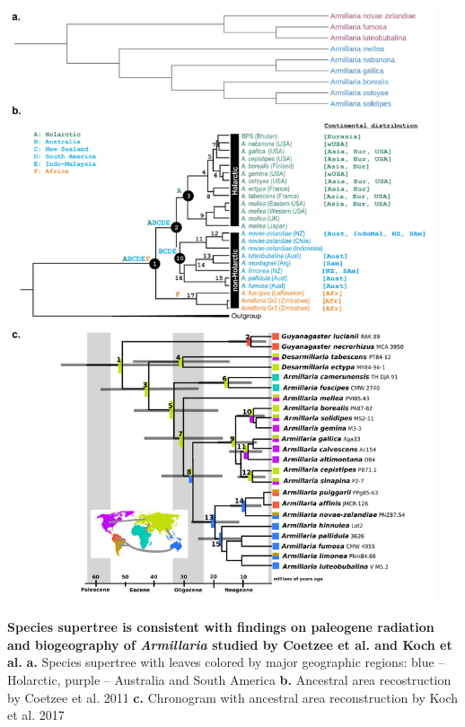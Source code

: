 \documentclass[two column, twoside, a4paper]{article}
\begin{document}
\begin{suppfigure*}
  \begin{center}
    \includegraphics[width=0.95\textwidth]{figures/Figure_4.png}
  \end{center}
  \caption{\sf \textbf{Species supertree is consistent with findings on paleogene radiation and biogeography of \textit{Armillaria} studied by Coetzee et al. and Koch et al.} \textbf{a.} Species supertree with leaves colored by major geographic regions: blue -- Holarctic, purple -- Australia and South America \textbf{b.} Ancestral area recostruction by Coetzee et al. 2011 \textbf{c.} Chronogram with ancestral area reconstruction by Koch et al. 2017} 
  \label{fig:biogeography}
\end{suppfigure*}
\end{document}
